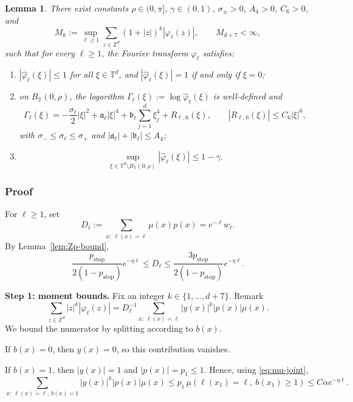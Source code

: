\documentclass[letterpaper,11pt,reqno]{amsart}
\newtheorem{lemma}[thm]{Lemma}
\theoremstyle{definition}
\begin{document}
\begin{lemma}\label{lem:varphi-input}
There exist constants \(\rho\in(0,\pi]\), \(\gamma\in(0,1)\), \(\sigma_\pm>0\), \(A_4>0\), \(C_6>0\), and
\[
M_k:=\sup_{\ell\ge1}\sum_{z\in\mathbb Z^d}(1+|z|)^{k}|\varphi_\ell(z)|,
\qquad
M_{d+7}<\infty,
\]
such that for every \(\ell\ge1\), the Fourier transform \(\widehat\varphi_\ell\) satisfies:

\begin{enumerate}
\item \(|\widehat\varphi_\ell(\xi)|\le1\) for all \(\xi\in\mathbb T^d\), and \(|\widehat\varphi_\ell(\xi)|=1\) if and only if \(\xi=0\);

\item on \(B_{\mathbb T}(0,\rho)\), the logarithm \(\Gamma_\ell(\xi):=\log\widehat\varphi_\ell(\xi)\) is well-defined and
\[
\Gamma_\ell(\xi)
=
-\frac{\sigma_\ell}{2}|\xi|^2
+
\mathfrak a_\ell|\xi|^4
+
\mathfrak b_\ell\sum_{j=1}^d \xi_j^4
+
R_{\ell,6}(\xi),
\qquad
|R_{\ell,6}(\xi)|\le C_6|\xi|^6,
\]
with \(\sigma_-\le\sigma_\ell\le\sigma_+\) and \(|\mathfrak a_\ell|+|\mathfrak b_\ell|\le A_4\);

\item
\[
\sup_{\xi\in\mathbb T^d\setminus B_{\mathbb T}(0,\rho)}|\widehat\varphi_\ell(\xi)|\le 1-\gamma.
\]
\end{enumerate}
\end{lemma}

\noindent
\subsubsection*{Proof}
For \(\ell\ge1\), set
\[
D_\ell:=\sum_{x:\ \ell(x)=\ell}\mu(x)p(x)=e^{-\ell}w_\ell.
\]
By Lemma~\ref{lem:Zp-bound},
\begin{equation}\label{eq:Dl-bounds-proof}
\frac{p_{\mathrm{stop}}}{2(1-p_{\mathrm{stop}})}e^{-\eta\ell}
\le
D_\ell
\le
\frac{3p_{\mathrm{stop}}}{2(1-p_{\mathrm{stop}})}e^{-\eta\ell}.
\end{equation}

\smallskip
\noindent\textbf{Step 1: moment bounds.}
Fix an integer \(k\in\{1,\dots,d+7\}\). Remark
\[
\sum_{z\in\mathbb Z^d}|z|^k|\varphi_\ell(z)|
=
D_\ell^{-1}\sum_{x:\ \ell(x)=\ell}|y(x)|^k|p(x)|\mu(x).
\]
We bound the numerator by splitting according to \(b(x)\).

If \(b(x)=0\), then \(y(x)=0\), so this contribution vanishes.

If \(b(x)=1\), then \(|y(x)|=1\) and \(|p(x)|=p_1\leq 1\). Hence, using \eqref{eq:mu-joint},
\[
\sum_{x:\ \ell(x)=\ell,\ b(x)=1}|y(x)|^k|p(x)|\mu(x)
\le
p_1\,\mu(\ell(x_1)=\ell,\ b(x_1)\ge1)
\le
C\alpha e^{-\eta\ell}.
\]
\end{document}
